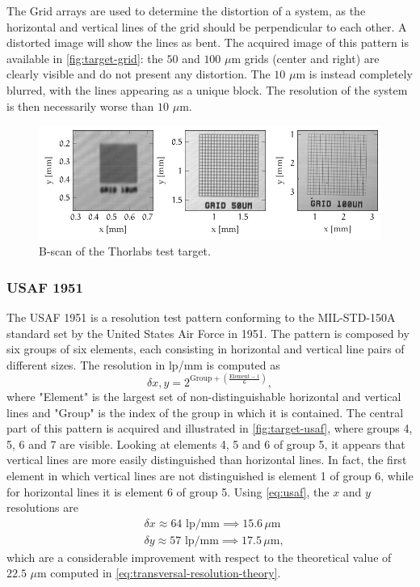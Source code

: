 The Grid arrays are used to determine the distortion of a system, as the horizontal and vertical lines of the grid should be perpendicular to each other. A distorted image will show the lines as bent. The acquired image of this pattern is available in \autoref{fig:target-grid}: the $50$ and $100$ $\mu$m grids (center and right) are clearly visible and do not present any distortion. The $10$ $\mu$m is instead completely blurred, with the lines appearing as a unique block. The resolution of the system is then necessarily worse than $10$ $\mu$m. 

\begin{figure}[hbt]
	\centering
	\includegraphics[width=\linewidth]{gfx/ch4/axsun/target/grid}
	\caption{B-scan of the Thorlabs test target.}\label{fig:target-grid}
\end{figure}


\subsubsection{USAF 1951}
The USAF 1951 is a resolution test pattern conforming to the MIL-STD-150A standard set by the United States Air Force in 1951. The pattern is composed by six groups of six elements, each consisting in horizontal and vertical line pairs of different sizes. The resolution in lp/mm is computed as
\begin{equation}\label{eq:usaf}
	\delta x,y = 2^{\text{Group} + \left(\frac{\text{Element} - 1}{6}\right)},
\end{equation}
where "Element" is the largest set of non-distinguishable horizontal and vertical lines and "Group" is the index of the group in which it is contained. The central part of this pattern is acquired and illustrated in \autoref{fig:target-usaf}, where groups 4, 5, 6 and 7 are visible. Looking at elements 4, 5 and 6 of group 5, it appears that vertical lines are more easily distinguished than horizontal lines. In fact, the first element in which vertical lines are not distinguished is element 1 of group 6, while for horizontal lines it is element 6 of group 5. Using \autoref{eq:usaf}, the $x$ and $y$ resolutions are
\begin{align}
	&\delta x \approx 64 \text{ lp/mm} \implies 15.6\,\mu\text{m} \\
	&\delta y \approx 57 \text{ lp/mm} \implies 17.5\,\mu\text{m},
\end{align}
which are a considerable improvement with respect to the theoretical value of $22.5$ $\mu$m computed in \autoref{eq:transversal-resolution-theory}. 

